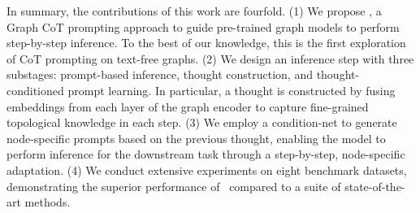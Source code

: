 In summary, the contributions of this work are fourfold.
(1)  We propose \model, a Graph CoT prompting approach to guide pre-trained graph models to perform step-by-step inference. To the best of our knowledge, this is the first exploration of CoT prompting on text-free graphs.
(2) We design an inference step with three substages: prompt-based inference, thought construction, and thought-conditioned prompt learning. In particular, a thought is constructed by fusing embeddings from each layer of the graph encoder to capture fine-grained topological knowledge in each step. 
(3) We employ a condition-net to generate node-specific prompts based on the previous thought, enabling the model to perform inference for the downstream task through a step-by-step, node-specific adaptation.
(4) We conduct extensive experiments on eight benchmark datasets, demonstrating the superior performance of \model\ compared to a suite of state-of-the-art methods.